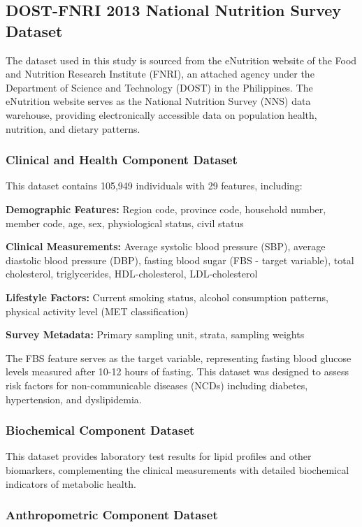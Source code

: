 \subsection{DOST-FNRI 2013 National Nutrition Survey Dataset}

The dataset used in this study is sourced from the eNutrition website of the Food and Nutrition Research Institute (FNRI), an attached agency under the Department of Science and Technology (DOST) in the Philippines. The eNutrition website serves as the National Nutrition Survey (NNS) data warehouse, providing electronically accessible data on population health, nutrition, and dietary patterns.

\subsubsection{Clinical and Health Component Dataset}

This dataset contains 105,949 individuals with 29 features, including:

\textbf{Demographic Features:} Region code, province code, household number, member code, age, sex, physiological status, civil status

\textbf{Clinical Measurements:} Average systolic blood pressure (SBP), average diastolic blood pressure (DBP), fasting blood sugar (FBS - target variable), total cholesterol, triglycerides, HDL-cholesterol, LDL-cholesterol

\textbf{Lifestyle Factors:} Current smoking status, alcohol consumption patterns, physical activity level (MET classification)

\textbf{Survey Metadata:} Primary sampling unit, strata, sampling weights

The FBS feature serves as the target variable, representing fasting blood glucose levels measured after 10-12 hours of fasting. This dataset was designed to assess risk factors for non-communicable diseases (NCDs) including diabetes, hypertension, and dyslipidemia.

\subsubsection{Biochemical Component Dataset}

This dataset provides laboratory test results for lipid profiles and other biomarkers, complementing the clinical measurements with detailed biochemical indicators of metabolic health.

\subsubsection{Anthropometric Component Dataset}

